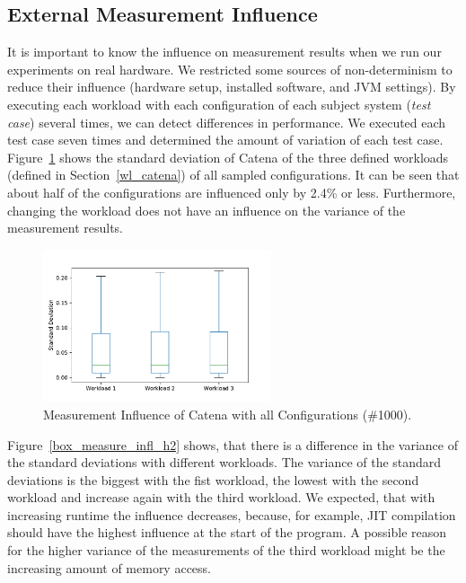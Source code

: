 \subsection{External Measurement Influence}
\label{ext_measurement_infl}

It is important to know the influence on measurement results when we run our experiments on real hardware. We restricted some sources of non-determinism to reduce their influence (hardware setup, installed software, and \ac{JVM} settings). By executing each workload with each configuration of each subject system (\textit{test case}) several times, we can detect differences in performance. We executed each test case seven times and determined the amount of variation of each test case. Figure~\ref{box_measure_infl_catena} shows the standard deviation of Catena of the three defined workloads (defined in Section~\ref{wl_catena}) of all sampled configurations. It can be seen that about half of the configurations are influenced only by 2.4\% or less. Furthermore, changing the workload does not have an influence on the variance of the measurement results. 

\begin{figure}
  \centering
  \includegraphics[width=0.6\textwidth]{images/catena_m_infl_wl_012}
  \caption{Measurement Influence of Catena with all Configurations (\#1000).}
  \label{box_measure_infl_catena}
\end{figure}

Figure~\ref{box_measure_infl_h2} shows, that there is a difference in the variance of the standard deviations with different workloads. The variance of the standard deviations is the biggest with the fist workload, the lowest with the second workload and increase again with the third workload. We expected, that with increasing runtime the influence decreases, because, for example, JIT compilation should have the highest influence at the start of the program. A possible reason for the higher variance of the measurements of the third workload might be the increasing amount of memory access. 

